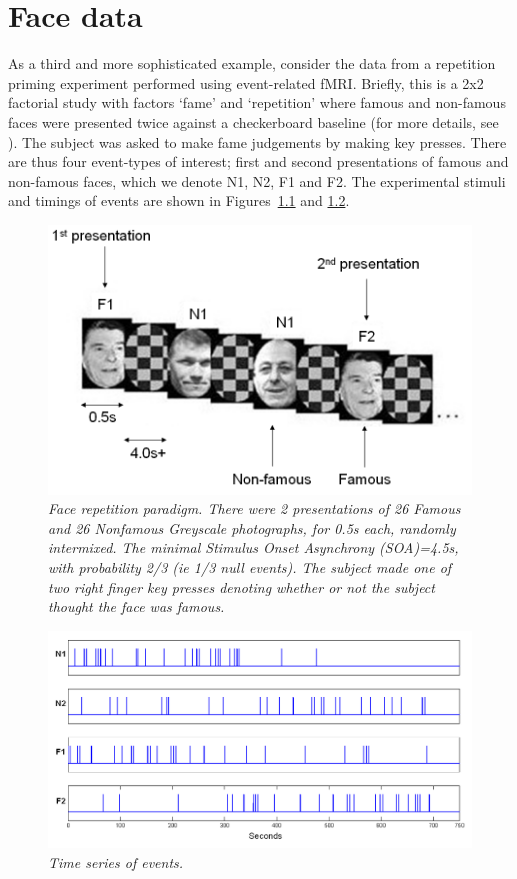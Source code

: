 \chapter{Face data \label{Chap:data:faces}}

As a third and more sophisticated example, consider the data from a repetition priming experiment performed using event-related fMRI.
 Briefly, this is a 2x2 factorial study with factors `fame' and `repetition' where famous and non-famous faces were presented twice against a checkerboard baseline (for more details, see \cite{rnah_face_rep}). The subject was asked to make fame judgements by making key presses. There are thus four event-types of interest; first and second presentations of famous and non-famous faces, which 
we denote N1, N2, F1 and F2. The experimental stimuli and timings of events are shown in Figures~\ref{face_stim} and \ref{face_timing}.
\begin{figure}
\begin{center}
\includegraphics[width=120mm]{faces/face_stim}
\caption{\em Face repetition paradigm.  There were 2 presentations of 26 Famous and 26 Nonfamous Greyscale photographs, for 0.5s each, randomly intermixed. The 
minimal Stimulus Onset Asynchrony (SOA)=4.5s, with probability 2/3 (ie 1/3 null events). The subject made one of two 
right finger key presses denoting whether or not the subject thought the face was famous. \label{face_stim}}
\end{center}
\end{figure}
\begin{figure}
\begin{center}
\includegraphics[width=120mm]{faces/face_timing}
\caption{\em Time series of events. \label{face_timing}}
\end{center}
\end{figure}

